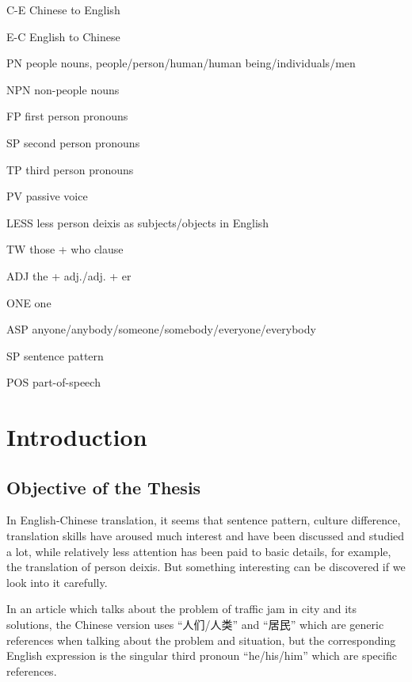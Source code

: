 \documentclass[degree=bachelor,language=english]{sysuthesis}
\begin{document}
\begin{denotation}[4em]
\item[C-E] Chinese to English
\item[E-C] English to Chinese
\item[PN] people nouns, people/person/human/human being/individuals/men
\item[NPN] non-people nouns
\item[FP] first person pronouns
\item[SP] second person pronouns
\item[TP] third person pronouns
\item[PV] passive voice
\item[LESS] less person deixis as subjects/objects in English
\item[TW] those + who clause
\item[ADJ] the + adj./adj. + er
\item[ONE] one
\item[ASP] anyone/anybody/someone/somebody/everyone/everybody
\item[SP] sentence pattern
\item[POS] part-of-speech

\end{denotation}



\mainmatter

\chapter{Introduction}

\section{Objective of the Thesis}

In English-Chinese translation, it seems that sentence pattern, culture difference, translation skills have aroused much interest and have been discussed and studied a lot, while relatively less attention has been paid to basic details, for example, the translation of person deixis.
But something interesting can be discovered if we look into it carefully.

In an article which talks about the problem of traffic jam in city and its solutions, the Chinese version uses “人们/人类” and “居民” which are generic references when talking about the problem and situation, but the corresponding English expression is the singular third pronoun “he/his/him” which are specific references.
\end{document}
